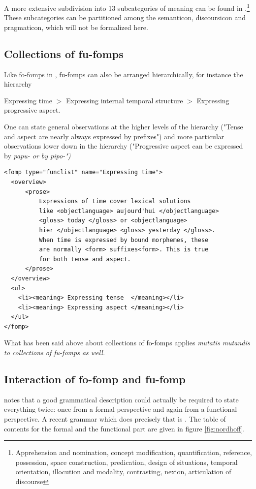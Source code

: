 \documentclass[a4paper,12pt]{article}
\begin{document}
A more extensive subdivision into 13 subcategories of meaning can be found in \citet{Lehmann2004docu}.\footnote{Apprehension and nomination, concept modification, quantification, reference, possession, space construction, predication, design of situations, temporal orientation, illocution and modality, contrasting, nexion, articulation of discourse}  These subcategories can be partitioned among the semanticon, discoursicon and pragmaticon, which will not be formalized here.


\subsection{Collections of fu-fomps}
Like fo-fomps in , fu-fomps can also be arranged hierarchically, for instance the hierarchy

\ea Expressing time $>$ Expressing internal temporal structure $>$ Expressing progressive aspect. \z

One can state general observations at the higher levels of the hierarchy ("Tense and aspect are nearly always expressed by prefixes") and more particular observations lower down in the hierarchy ("Progressive aspect can be expressed by \em papu- \em or by \em pipo-\em")

\ea\label{xml:funclist}
\begin{verbatim}
<fomp type="funclist" name="Expressing time">
  <overview>
      <prose>
          Expressions of time cover lexical solutions
          like <objectlanguage> aujourd'hui </objectlanguage>
          <gloss> today </gloss> or <objectlanguage>
          hier </objectlanguage> <gloss> yesterday </gloss>.
          When time is expressed by bound morphemes, these
          are normally <form> suffixes<form>. This is true
          for both tense and aspect.
      </prose>
  </overview>
  <ul>
    <li><meaning> Expressing tense  </meaning></li>
    <li><meaning> Expressing aspect </meaning></li>
  </ul>
</fomp>
\end{verbatim}
\z

What has been said above about collections of fo-fomps applies \em mutatis mutandis \em to collections of fu-fomps as well.


\subsection{Interaction of fo-fomp and fu-fomp}
\citet{Mosel2006craft} notes that a good grammatical description could actually be required to state everything twice: once from a formal perspective and again from a functional perspective. A recent grammar which does precisely that is \citet{Nordhoff2009phd}. The table of contents for the formal and the functional part are given in figure \ref{fig:nordhoff}.
\end{document}
